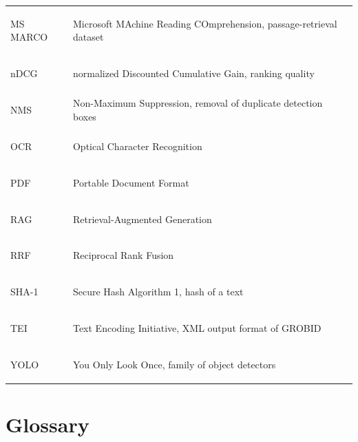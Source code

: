 \documentclass[11pt,a4paper]{article}
\begin{document}
\begin{center}
\begin{tabularx}{\linewidth}{@{}lL@{}}
\hypertarget{gl:MSMARCO}{MS MARCO} & Microsoft MAchine Reading COmprehension, passage-retrieval dataset \\
\hypertarget{gl:nDCG}{nDCG} & normalized Discounted Cumulative Gain, ranking quality \\
\hypertarget{gl:NMS}{NMS} & Non-Maximum Suppression, removal of duplicate detection boxes \\
\hypertarget{gl:OCR}{OCR} & Optical Character Recognition \\
\hypertarget{gl:PDF}{PDF} & Portable Document Format \\
\hypertarget{gl:RAG}{RAG} & Retrieval-Augmented Generation \\
\hypertarget{gl:RRF}{RRF} & Reciprocal Rank Fusion \\
\hypertarget{gl:SHA}{SHA-1} & Secure Hash Algorithm 1, hash of a text \\
\hypertarget{gl:TEI}{TEI} & Text Encoding Initiative, XML output format of GROBID \\
\hypertarget{gl:YOLO}{YOLO} & You Only Look Once, family of object detectors \\
\bottomrule
\end{tabularx}
\end{center}

\section{Glossary}
\label{sec:lexique}
\end{document}
